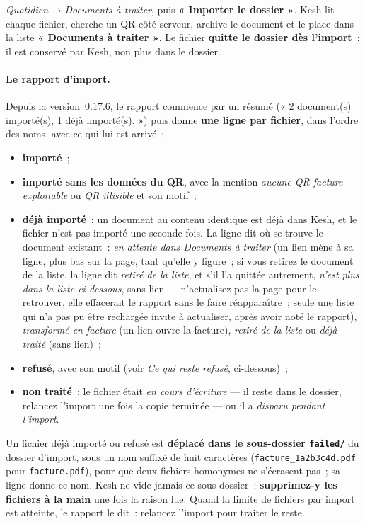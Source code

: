 \documentclass[a4paper,11pt,oneside]{article}
\begin{document}
\emph{Quotidien} → \emph{Documents à traiter}, puis \textbf{« Importer le dossier »}.
Kesh lit chaque fichier, cherche un QR côté serveur, archive le document et le place dans
la liste \textbf{« Documents à traiter »}. Le fichier \textbf{quitte le dossier dès
l'import}~: il est conservé par Kesh, non plus dans le dossier.

\paragraph{Le rapport d'import.} Depuis la version~0.17.6, le rapport commence par un
résumé (« 2 document(s) importé(s), 1 déjà importé(s). ») puis donne \textbf{une ligne
par fichier}, dans l'ordre des noms, avec ce qui lui est arrivé~:
\begin{itemize}
    \item \textbf{importé}~;
    \item \textbf{importé sans les données du QR}, avec la mention \emph{aucune QR-facture
          exploitable} ou \emph{QR illisible} et son motif~;
    \item \textbf{déjà importé}~: un document au contenu identique est déjà dans Kesh, et
          le fichier n'est pas importé une seconde fois. La ligne dit où se trouve le
          document existant~: \emph{en attente dans Documents à traiter} (un lien mène à
          sa ligne, plus bas sur la page, tant qu'elle y figure~; si vous retirez le
          document de la liste, la ligne dit \emph{retiré de la liste}, et s'il l'a quittée
          autrement, \emph{n'est plus dans la liste ci-dessous}, sans lien --- n'actualisez
          pas la page pour le retrouver, elle effacerait le rapport sans le faire
          réapparaître~; seule une liste qui n'a pas pu être rechargée invite à
          actualiser, après avoir noté le rapport), \emph{transformé en facture} (un lien ouvre la
          facture), \emph{retiré de la liste} ou \emph{déjà traité} (sans lien)~;
    \item \textbf{refusé}, avec son motif (voir \emph{Ce qui reste refusé}, ci-dessous)~;
    \item \textbf{non traité}~: le fichier était \emph{en cours d'écriture} --- il reste
          dans le dossier, relancez l'import une fois la copie terminée --- ou il a
          \emph{disparu pendant l'import}.
\end{itemize}
Un fichier déjà importé ou refusé est \textbf{déplacé dans le sous-dossier
\texttt{failed/}} du dossier d'import, sous un nom suffixé de huit caractères
(\texttt{facture\_1a2b3c4d.pdf} pour \texttt{facture.pdf}), pour que deux fichiers
homonymes ne s'écrasent pas~; sa ligne donne ce nom. Kesh ne vide jamais ce
sous-dossier~: \textbf{supprimez-y les fichiers à la main} une fois la raison lue. Quand
la limite de fichiers par import est atteinte, le rapport le dit~: relancez l'import pour
traiter le reste.
\end{document}
